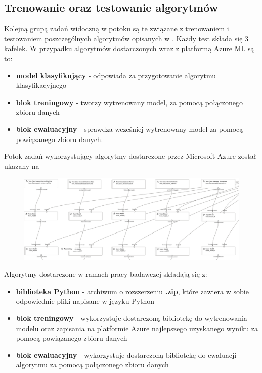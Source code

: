 \subsection{Trenowanie oraz testowanie algorytmów}
Kolejną grupą zadań widoczną w potoku są te związane z trenowaniem i testowaniem poszczególnych algorytmów opisanych w . Każdy test składa się 3 kafelek. W przypadku algorytmów dostarczonych wraz z platformą Azure ML są to:
\begin{itemize}
    \item \textbf{model klasyfikujący} - odpowiada za przygotowanie algorytmu klasyfikacyjnego
    \item \textbf{blok treningowy} - tworzy wytrenowany model, za pomocą połączonego zbioru danych
    \item \textbf{blok ewaluacyjny} - sprawdza wcześniej wytrenowany model za pomocą powiązanego zbioru danych.
\end{itemize}
Potok zadań wykorzystujący algorytmy dostarczone przez Microsoft Azure został ukazany na 

\begin{figure}[H]
    \centering
    \includegraphics[width=\textwidth]{images/ms_pipe}
    \label{fig:ms-pipe}
\end{figure}

Algorytmy dostarczone w ramach pracy badawczej składają się z:
\begin{itemize}
    \item \textbf{biblioteka Python} - archiwum o rozszerzeniu \textbf{.zip}, które zawiera w sobie odpowiednie pliki napisane w języku Python
    \item \textbf{blok treningowy} - wykorzystuje dostarczoną bibliotekę do wytrenowania modelu oraz zapisania na platformie Azure najlepszego uzyskanego wyniku za pomocą powiązanego zbioru danych
    \item \textbf{blok ewaluacyjny} - wykorzystuje dostarczoną bibliotekę do ewaluacji algorytmu za pomocą połączonego zbioru danych
\end{itemize}

